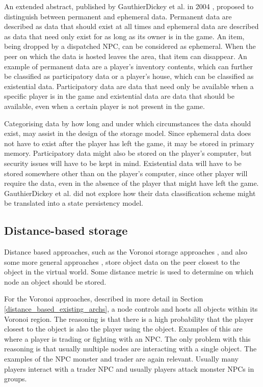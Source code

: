 \documentclass[10pt,a4paper,journal,cspaper,compsoc]{IEEEtran}
\begin{document}
An extended abstract, published by GauthierDickey et al. in 2004 \cite{hybrid_storage1}, proposed to distinguish between permanent and ephemeral
data. Permanent data are described as data that should exist at all times and ephemeral data are described as data that need only exist for as long
as its owner is in the game. An item, being dropped by a dispatched NPC, can be considered as ephemeral. When the peer on which the data is hosted
leaves the area, that item can disappear. An example of permanent data are a player's inventory contents, which can further be classified as
participatory data or a player's house, which can be classified as existential data. Participatory data are data that need only be available when a
specific player is in the game and existential data are data that should be available, even when a certain player is not present in the game.

Categorising data by how long and under which circumstances the data should exist, may assist in the design of the storage model. Since ephemeral
data does not have to exist after the player has left the game, it may be stored in primary memory. Participatory data might also be stored on the
player's computer, but security issues will have to be kept in mind. Existential data will have to be stored somewhere other than on the player's
computer, since other player will require the data, even in the absence of the player that might have left the game. GauthierDickey et al. did not
explore how their data classification scheme might be translated into a state persistency model.

\subsection{Distance-based storage}
\label{distance_based_storage}

Distance based approaches, such as the Voronoi storage approaches \cite{Buyukkaya_voronoi_state_management}, \cite{Hu_voronoi_IM} and also some more
general approaches \cite{colyseus_distance_based}, store object data on the peer closest to the object in the virtual world. Some distance metric is
used to determine on which node an object should be stored.

For the Voronoi approaches, described in more detail in Section \ref{distance_based_existing_archs}, a node controls and hosts all objects within its
Voronoi region. The reasoning is that there is a high probability that the player closest to the object is also the player using the object. Examples
of this are where a player is trading or fighting with an NPC. The only problem with this reasoning is that usually multiple nodes are interacting
with a single object. The examples of the NPC monster and trader are again relevant. Usually many players interact with a trader NPC and usually
players attack monster NPCs in groups.
\end{document}

